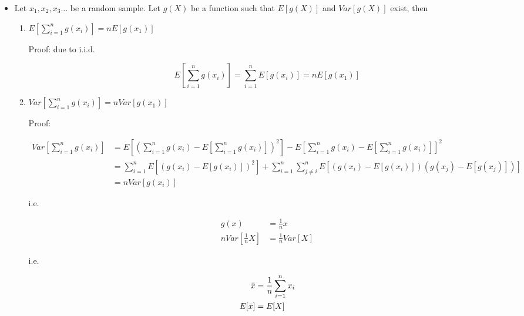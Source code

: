 \documentclass[11pt,letterpaper,titlepage]{article}
\begin{document}
\begin{itemize}

    \item Let $x_1, x_2, x_3...$ be a random sample. Let $g(X)$ be a function such that $E[g(X)]$ and $Var[g(X)]$ exist, then
    
    \begin{enumerate}
    
        \item $E[\sum_{i=1}^{n} g(x_i)] = n E[g(x_1)]$
        
        Proof: due to i.i.d.
        
        \begin{equation*}
            E[\sum_{i=1}^{n} g(x_i)] = \sum_{i=1}^{n} E[g(x_i)] = n E[g(x_1)]
        \end{equation*}
        
        \item $Var[\sum_{i=1}^{n} g(x_i)] = n Var[g(x_1)]$
        
        Proof:
        
        \begin{equation*}
            \begin{aligned}
                Var[\sum_{i=1}^{n} g(x_i)] &= E[(\sum_{i=1}^{n}g(x_i) - E[\sum_{i=1}^{n}g(x_i)])^2] - E[\sum_{i=1}^{n}g(x_i) - E[\sum_{i=1}^{n}g(x_i)]]^2 \\    
                &= \sum_{i=1}^{n} E[(g(x_i) - E[g(x_i)])^2] + \sum_{i=1}^{n}\sum_{j \neq i}^{n} E[(g(x_i) - E[g(x_i)])(g(x_j) - E[g(x_j)])] \\
                &= n Var[g(x_i)]
            \end{aligned}
        \end{equation*}
        
        i.e.
        
        \begin{equation*}
            \begin{aligned}
                g(x) &= \frac{1}{n} x \\
                n Var[\frac{1}{n} X] &= \frac{1}{n} Var[X]
            \end{aligned}
        \end{equation*}
        
        i.e.
        
        \begin{equation*}
            \begin{aligned}
                \Bar{x} &= \frac{1}{n} \sum_{i=1}^{n} x_i \\
                E[\Bar{x}] &= E[X]
            \end{aligned}
        \end{equation*}
        
    \end{enumerate}
    
    
\end{itemize}
    
\end{document}
